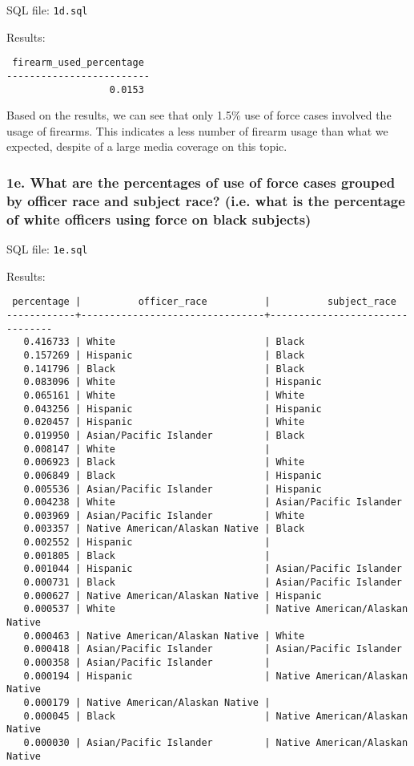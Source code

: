 \documentclass[10pt]{article}
\begin{document}
SQL file: \texttt{1d.sql}

Results:

\begin{verbatim}
 firearm_used_percentage
-------------------------
                  0.0153
\end{verbatim}

Based on the results, we can see that only 1.5\% use of force cases involved the usage of firearms. This indicates a less number of firearm usage than what we expected, despite of a large media coverage on this topic.


\subsubsection*{1e. What are the percentages of use of force cases grouped by officer race and subject race? (i.e. what is the percentage of white officers using force on black subjects)}

SQL file: \texttt{1e.sql}

Results:

\begin{verbatim}
 percentage |          officer_race          |          subject_race
------------+--------------------------------+--------------------------------
   0.416733 | White                          | Black
   0.157269 | Hispanic                       | Black
   0.141796 | Black                          | Black
   0.083096 | White                          | Hispanic
   0.065161 | White                          | White
   0.043256 | Hispanic                       | Hispanic
   0.020457 | Hispanic                       | White
   0.019950 | Asian/Pacific Islander         | Black
   0.008147 | White                          |
   0.006923 | Black                          | White
   0.006849 | Black                          | Hispanic
   0.005536 | Asian/Pacific Islander         | Hispanic
   0.004238 | White                          | Asian/Pacific Islander
   0.003969 | Asian/Pacific Islander         | White
   0.003357 | Native American/Alaskan Native | Black
   0.002552 | Hispanic                       |
   0.001805 | Black                          |
   0.001044 | Hispanic                       | Asian/Pacific Islander
   0.000731 | Black                          | Asian/Pacific Islander
   0.000627 | Native American/Alaskan Native | Hispanic
   0.000537 | White                          | Native American/Alaskan Native
   0.000463 | Native American/Alaskan Native | White
   0.000418 | Asian/Pacific Islander         | Asian/Pacific Islander
   0.000358 | Asian/Pacific Islander         |
   0.000194 | Hispanic                       | Native American/Alaskan Native
   0.000179 | Native American/Alaskan Native |
   0.000045 | Black                          | Native American/Alaskan Native
   0.000030 | Asian/Pacific Islander         | Native American/Alaskan Native
\end{verbatim}
\end{document}
